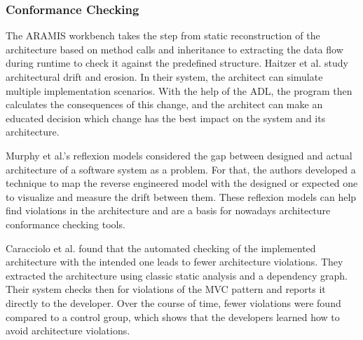 \documentclass[sigplan, anonymous, review]{acmart}
\begin{document}
\subsubsection{Conformance Checking}

The ARAMIS workbench \cite{Aramis} takes the step from static reconstruction of the architecture based on method calls and inheritance to extracting the data flow during runtime to check it against the predefined structure. 
Haitzer et al. \cite{Arc-Decision} study architectural drift and erosion. In their system, the architect can simulate multiple implementation scenarios. With the help of the ADL, the program then calculates the consequences of this change, and the architect can make an educated decision which change has the best impact on the system and its architecture. 

Murphy et al.'s reflexion models \cite{MurphyRefl} considered the gap between designed and actual architecture of a software system as a problem. For that, the authors developed a technique to map the reverse engineered model with the designed or expected one to visualize and measure the drift between them. These reflexion models can help find violations in the architecture and are a basis for nowadays architecture conformance checking tools. 

Caracciolo et al. \cite{ArcConf} found that the automated checking of the implemented architecture with the intended one leads to fewer architecture violations. They extracted the architecture using classic static analysis and a dependency graph. Their system checks then for violations of the MVC pattern and reports it directly to the developer. Over the course of time, fewer violations were found compared to a control group, which shows that the developers learned how to avoid architecture violations.
\end{document}
